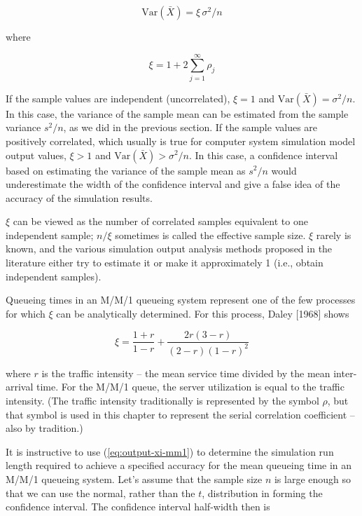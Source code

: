 \begin{equation}
\mathrm{Var}(\bar{X}) = \xi \, \sigma^2 / n
\label{eq:output-variance-mean-xi}
\end{equation}

where

\begin{equation}
\xi = 1 + 2 \sum_{j=1}^{\infty} \rho_j
\label{eq:output-xi}
\end{equation}

If the sample values are independent (uncorrelated), $\xi = 1$ and
$\mathrm{Var}(\bar{X}) = \sigma^2 / n$. In this case, the variance of the
sample mean can be estimated from the
\noindent sample variance $s^2/n$, as we did in the previous section. If the sample
values are positively correlated, which usually is true for computer system
simulation model output values, $\xi > 1$ and $\mathrm{Var}(\bar{X}) >
\sigma^2/n$. In this case, a confidence interval based on estimating the
variance of the sample mean as $s^2/n$ would underestimate the width of the
confidence interval and give a false idea of the accuracy of the simulation
results.

$\xi$ can be viewed as the number of correlated samples equivalent to one
independent sample; $n/\xi$ sometimes is called the effective sample size.
$\xi$ rarely is known, and the various simulation output analysis methods
proposed in the literature either try to estimate it or make it approximately
1 (i.e., obtain independent samples).

Queueing times in an M/M/1 queueing system represent one of the few processes
for which $\xi$ can be analytically determined. For this process, Daley
[1968] shows

\begin{equation}
\xi = \frac{1 + r}{1 - r} + \frac{2r(3 - r)}{(2 - r)(1 - r)^2}
\label{eq:output-xi-mm1}
\end{equation}

where $r$ is the traffic intensity -- the mean service time divided by the
mean inter-arrival time. For the M/M/1 queue, the server utilization is equal
to the traffic intensity. (The traffic intensity traditionally is represented
by the symbol $\rho$, but that symbol is used in this chapter to represent the
serial correlation coefficient -- also by tradition.)

It is instructive to use (\ref{eq:output-xi-mm1}) to determine the simulation
run length required to achieve a specified accuracy for the mean queueing time
in an M/M/1 queueing system. Let's assume that the sample size $n$ is large
enough so that we can use the normal, rather than the $t$, distribution in
forming the confidence interval. The confidence interval half-width then is

